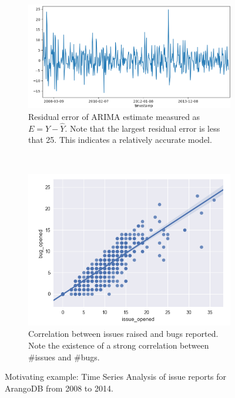 \begin{figure}
\begin{subfigure}[t]{0.57\textwidth}
		\centering
		\includegraphics[width=\linewidth]{images/sample/sample_mre.png}
		\caption{Residual error of ARIMA estimate measured as $E=Y-\hat{Y}$. Note that the largest residual error is less that 25. This indicates a relatively accurate model.}
		\label{fig:sample_resid}	
	\end{subfigure}%
	~
	\begin{subfigure}[t]{0.4\textwidth}
		\centering
		\includegraphics[width=\linewidth]{images/sample/sample_corr.png}
		\caption{Correlation between issues raised and bugs reported. Note the existence of a strong correlation between \#issues and \#bugs.}
		\label{fig:sample_corr}	
	\end{subfigure}%
	\caption{Motivating example: Time Series Analysis of issue reports for ArangoDB from 2008 to 2014.}
	\label{fig:ArangoDB}
\end{figure}
